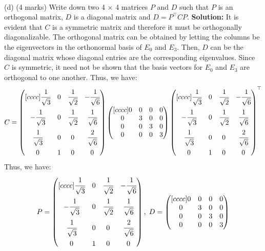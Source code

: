\documentclass{article}
\begin{document}
\newline
\\ (d)  (4 marks) Write down two 4 × 4 matrices $P$ and $D$ such that $P$ is an orthogonal matrix, $D$ is a diagonal matrix and $D = P^\top CP$.
\newline
\textbf{Solution:} 
It is evident that $C$ is a symmetric matrix and therefore it must be orthogonally diagonalizable. The orthogonal matrix can be obtained by letting the columns be the eigenvectors in the orthonormal basis of $E_0$ and $E_3$. Then, $D$ can be the diagonal matrix whose diagonal entries are the corresponding eigenvalues. Since $C$ is symmetric, it need not be shown that the basis vectors for $E_0$ and $E_3$ are orthogonal to one another. Thus, we have:
$$C = 
\begin{pmatrix}[cccc] 
 \cfrac{1}{\sqrt{3}} & 0 & \cfrac{1}{\sqrt{2}} & -\cfrac{1}{\sqrt{6}} \\[10pt]
 -\cfrac{1}{\sqrt{3}} & 0 & \cfrac{1}{\sqrt{2}} & \cfrac{1}{\sqrt{6}} \\[10pt]
 \cfrac{1}{\sqrt{3}} & 0 & 0 & \cfrac{2}{\sqrt{6}} \\[10pt]
0 & 1 & 0 & 0
\end{pmatrix}
\begin{pmatrix}[cccc]
    0 & 0 & 0 & 0 \\
    0 & 3 & 0 & 0\\
    0 & 0 & 3 & 0 \\
    0 & 0 & 0 & 3
\end{pmatrix} 
\begin{pmatrix}[cccc] 
 \cfrac{1}{\sqrt{3}} & 0 & \cfrac{1}{\sqrt{2}} & -\cfrac{1}{\sqrt{6}} \\[10pt]
 -\cfrac{1}{\sqrt{3}} & 0 & \cfrac{1}{\sqrt{2}} & \cfrac{1}{\sqrt{6}} \\[10pt]
 \cfrac{1}{\sqrt{3}} & 0 & 0 & \cfrac{2}{\sqrt{6}} \\[10pt]
0 & 1 & 0 & 0
\end{pmatrix}^\top$$
Thus, we have:
$$P = \begin{pmatrix}[cccc] 
 \cfrac{1}{\sqrt{3}} & 0 & \cfrac{1}{\sqrt{2}} & -\cfrac{1}{\sqrt{6}} \\[10pt]
 -\cfrac{1}{\sqrt{3}} & 0 & \cfrac{1}{\sqrt{2}} & \cfrac{1}{\sqrt{6}} \\[10pt]
 \cfrac{1}{\sqrt{3}} & 0 & 0 & \cfrac{2}{\sqrt{6}} \\[10pt]
0 & 1 & 0 & 0
\end{pmatrix}, \; D = 
\begin{pmatrix}[cccc]
    0 & 0 & 0 & 0 \\
    0 & 3 & 0 & 0\\
    0 & 0 & 3 & 0 \\
    0 & 0 & 0 & 3
\end{pmatrix}$$
\end{document}
